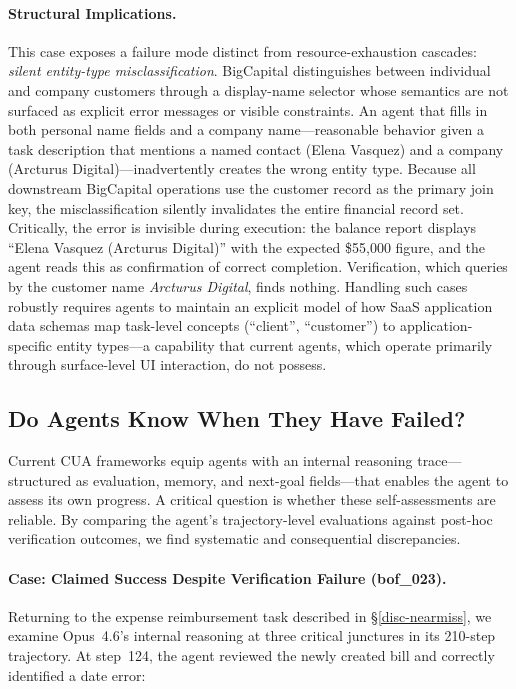 \paragraph{Structural Implications.}
This case exposes a failure mode distinct from resource-exhaustion cascades: \emph{silent entity-type misclassification}. BigCapital distinguishes between individual and company customers through a display-name selector whose semantics are not surfaced as explicit error messages or visible constraints. An agent that fills in both personal name fields and a company name---reasonable behavior given a task description that mentions a named contact (Elena Vasquez) and a company (Arcturus Digital)---inadvertently creates the wrong entity type. Because all downstream BigCapital operations use the customer record as the primary join key, the misclassification silently invalidates the entire financial record set. Critically, the error is invisible during execution: the balance report displays ``Elena Vasquez (Arcturus Digital)'' with the expected \$55,000 figure, and the agent reads this as confirmation of correct completion. Verification, which queries by the customer name \emph{Arcturus Digital}, finds nothing. Handling such cases robustly requires agents to maintain an explicit model of how SaaS application data schemas map task-level concepts (``client'', ``customer'') to application-specific entity types---a capability that current agents, which operate primarily through surface-level UI interaction, do not possess.


\subsection{Do Agents Know When They Have Failed?}
\label{disc-selfeval}

Current CUA frameworks equip agents with an internal reasoning trace---structured as evaluation, memory, and next-goal fields---that enables the agent to assess its own progress. A critical question is whether these self-assessments are reliable. By comparing the agent's trajectory-level evaluations against post-hoc verification outcomes, we find systematic and consequential discrepancies.

\paragraph{Case: Claimed Success Despite Verification Failure ({\ttfamily bof\_023}).}
Returning to the expense reimbursement task described in \S\ref{disc-nearmiss}, we examine Opus~4.6's internal reasoning at three critical junctures in its 210-step trajectory. At step~124, the agent reviewed the newly created bill and correctly identified a date error:

